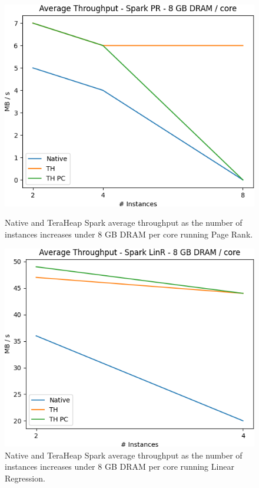 \begin{figure}[thbp]
        \centering
        \includegraphics[width=\linewidth]{./fig/PR_64_THR.png}
    \caption{Native and TeraHeap Spark average throughput
        as the number of instances increases under 8 GB DRAM per core running Page Rank.}
\label{fig:pr_64_thr}
        \includegraphics[width=\linewidth]{./fig/LINR_64_THR.png}
    \caption{Native and TeraHeap Spark average throughput
        as the number of instances increases under 8 GB DRAM per core running Linear Regression.}
                \label{fig:linr_64_thr}
\end{figure}

